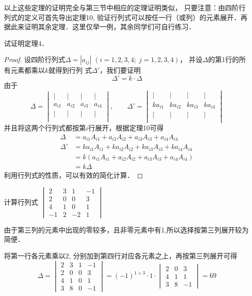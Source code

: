 以上这些定理的证明完全与第三节中相应的定理证明类似，
只要注意：由四阶行列式的定义可首先导出定理10, 验证行列式可以按任一行（或列）的元素展开．再据此来证明其余定理．这里仅举一例，其余同学们可自行练习．



\begin{example}
试证明定理4．
\end{example}

\begin{proof}
    设四阶行列式$\Delta=|a_{ij}|$ $(i=1, 2, 3, 4;\; 
j=1, 2, 3, 4)$，
并设$\Delta$的第1行的所有元素都乘以$k$就得到行列
式$\Delta'$，我们要证明
\[\Delta'=k\cdot \Delta\]
由于
\[\Delta =\begin{vmatrix}
|&|&|&|\\
a_{i1}&a_{i2}&a_{i3}&a_{i4}\\
|&|&|&|\\ 
\end{vmatrix},\qquad \Delta' =\begin{vmatrix}
|&|&|&|\\
ka_{i1}&ka_{i2}&ka_{i3}&ka_{i4}\\
|&|&|&|\\ 
\end{vmatrix}\]
并且将这两个行列式都按第$i$行展开，根据定理10可得
\[\begin{split}
\Delta &= a_{i1}A_{i1}+a_{i2}A_{i2}+ a_{i3}A_{i3}+a_{i4}A_{i4} \\
\Delta'&= ka_{i1}A_{i1}+ka_{i2}A_{i2}+ ka_{i3}A_{i3}+ka_{i4}A_{i4}\\
&=k(a_{i1}A_{i1}+a_{i2}A_{i2}+ a_{i3}A_{i3}+a_{i4}A_{i4})\\
&=k\Delta
\end{split}\]
利用行列式的性质，可以有效的简化计算．
\end{proof}

\begin{example}
计算行列式
$\begin{vmatrix}
    2&3&1&-1\\2&0&0&3\\
    4&1&0&1\\-1&2&-2&1
\end{vmatrix}$
\end{example}

\begin{analyze}
由于第三列的元素中出现的零较多，且非零元素中有1,所以选择按第三列展开较为简便．
\end{analyze}

\begin{solution}
将第一行各元素乘以2, 分别加到第四行对应各元素之上，再按第三列展开可得     
\[\Delta=\begin{vmatrix}
    2&3&1&-1\\
    2&0&0&3\\
    4&1&0&1\\
    3&8&0&-1
\end{vmatrix}=(-1)^{1+3}\cdot 1\cdot \begin{vmatrix}
    2&0&3\\4&1&1\\3&8&-1
\end{vmatrix}=69\]
\end{solution}

